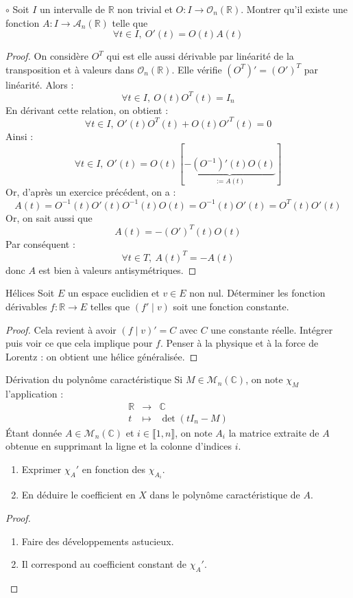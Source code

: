 \documentclass[french,a4paper]{article}
\newcommand{\R}{\mathbb{R}}
\newcommand{\C}{\mathbb{C}}
\newcommand{\inv}{^{-1}}
\theoremstyle{plain}
\theoremstyle{definition}
\theoremstyle{remark}
\begin{document}
\begin{ex}[Moulin.FV.10]{$\circ$}
	Soit $I$ un intervalle de $\R$ non trivial et $O:I\to\mathcal{O}_n(\R)$. Montrer qu'il existe une fonction $A:I\to\mathcal{A}_n(\R)$ telle que $$\forall t\in I,\ O'(t)=O(t)A(t)$$
\end{ex}
\begin{proof}
	On considère $O^T$ qui est elle aussi dérivable par linéarité de la transposition et à valeurs dans $\mathcal{O}_n(\R)$. Elle vérifie $(O^T)'=(O')^T$ par linéarité. Alors : $$\forall t\in I,\ O(t)O^T(t)=I_n$$ En dérivant cette relation, on obtient : $$\forall t\in I,\ O'(t)O^T(t)+O(t)O'^T(t)=0$$ Ainsi : $$\forall t\in I,\ O'(t)=O(t)\left[\underbrace{-(O\inv)'(t)O(t)}_{:=A(t)}\right]$$ Or, d'après un exercice précédent, on a : $$A(t)=O\inv(t)O'(t)O\inv(t)O(t)=O\inv(t)O'(t)=O^T(t)O'(t)$$ Or, on sait aussi que $$A(t)=-(O')^T(t)O(t)$$ Par conséquent : $$\forall t\in T,\ A(t)^T=-A(t)$$ donc $A$ est bien à valeurs antisymétriques.
\end{proof}

\begin{ex}[Moulin.FV.11]{Hélices}
	Soit $E$ un espace euclidien et $v\in E$ non nul. Déterminer les fonction dérivables $f:\R\to E$ telles que $(f'\mid v)$ soit une fonction constante.
\end{ex}
\begin{proof}
	Cela revient à avoir $(f\mid v)'=C$ avec $C$ une constante réelle. Intégrer puis voir ce que cela implique pour $f$. Penser à la physique et à la force de Lorentz : on obtient une hélice généralisée.
\end{proof}

\begin{ex}[Moulin.FV.12]{Dérivation du polynôme caractéristique}
	Si $M\in\mathcal{M}_n(\C)$, on note $\chi_M$ l'application : $$\begin{array}{rcl}
		\R&\longrightarrow&\C\\
		t&\longmapsto&\det(tI_n-M)
	\end{array}$$ Étant donnée $A\in\mathcal{M}_n(\C)$ et $i\in\llbracket1,n\rrbracket$, on note $A_i$ la matrice extraite de $A$ obtenue en supprimant la ligne et la colonne d'indices $i$.
	\begin{enumerate}
		\item Exprimer $\chi_A'$ en fonction des $\chi_{A_i}$.
		\item En déduire le coefficient en $X$ dans le polynôme caractéristique de $A$.
	\end{enumerate}
\end{ex}
\begin{proof}
	\begin{enumerate}
		\item Faire des développements astucieux.
		\item Il correspond au coefficient constant de $\chi_A'$.
	\end{enumerate}
\end{proof}
\end{document}
